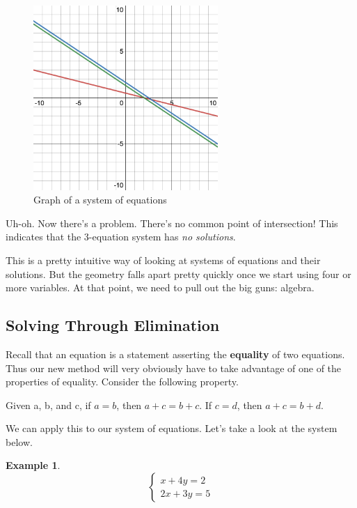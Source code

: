 \documentclass{scrbook}
\theoremstyle{definition}
\newtheorem{example}{Example}
\begin{document}
\begin{figure}[H]
  \includegraphics[width=7cm]{system-of-eqs(2).png}
  \centering
  \caption{Graph of a system of equations}
\end{figure}

Uh-oh. Now there's a problem. There's no common point of intersection! This indicates that the 3-equation system has \textit{no solutions}.

This is a pretty intuitive way of looking at systems of equations and their solutions. But the geometry falls apart pretty quickly once we start using four or more variables. At that point, we need to pull out the big guns: algebra. 

\subsection{Solving Through Elimination}

Recall that an equation is a statement asserting the \textbf{equality} of two equations. Thus our new method will very obviously have to take advantage of one of the properties of equality. Consider the following property. 

\begin{center}
  Given a, b, and c, if $a = b$, then $a + c = b + c$. If $c = d$, then $a + c = b + d$. 
\end{center}

We can apply this to our system of equations. Let's take a look at the system below. 

\begin{example}
  \[
    \begin{cases}
      x + 4y = 2\\
      2x + 3y = 5
    \end{cases}
  \]
\end{example}
\end{document}
